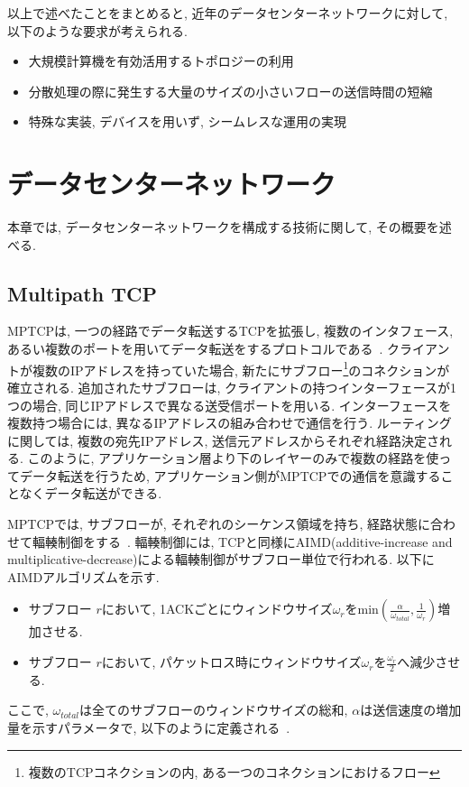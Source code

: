 \documentclass[10pt, a4paper, twocolumn]{jsarticle}
\begin{document}
以上で述べたことをまとめると, 近年のデータセンターネットワークに対して, 以下のような要求が考えられる.
\begin{itemize}
  \item 大規模計算機を有効活用するトポロジーの利用
  \item 分散処理の際に発生する大量のサイズの小さいフローの送信時間の短縮
  \item 特殊な実装, デバイスを用いず, シームレスな運用の実現
\end{itemize}

\section{データセンターネットワーク}
\label{sec:datacenter}
本章では, データセンターネットワークを構成する技術に関して, その概要を述べる.
\subsection{Multipath TCP}
MPTCPは, 一つの経路でデータ転送するTCPを拡張し, 複数のインタフェース,
あるい複数のポートを用いてデータ転送をするプロトコルである~\cite{mptcp}.
クライアントが複数のIPアドレスを持っていた場合, 新たにサブフロー\footnote{複数のTCPコネクションの内,
ある一つのコネクションにおけるフロー}のコネクションが確立される.
追加されたサブフローは, クライアントの持つインターフェースが1つの場合, 同じIPアドレスで異なる送受信ポートを用いる.
インターフェースを複数持つ場合には, 異なるIPアドレスの組み合わせで通信を行う.
ルーティングに関しては, 複数の宛先IPアドレス, 送信元アドレスからそれぞれ経路決定される.
このように, アプリケーション層より下のレイヤーのみで複数の経路を使ってデータ転送を行うため,
アプリケーション側がMPTCPでの通信を意識することなくデータ転送ができる.

MPTCPでは, サブフローが, それぞれのシーケンス領域を持ち, 経路状態に合わせて輻輳制御をする~\cite{cong}.
輻輳制御には, TCPと同様にAIMD(additive-increase and
multiplicative-decrease)による輻輳制御がサブフロー単位で行われる.
以下にAIMDアルゴリズムを示す.

\begin{itemize}
\item サブフロー $r$において,
1ACKごとにウィンドウサイズ$\omega_{r}$をmin$(\frac{\alpha}{\omega_{total}},
\frac{1}{\omega_r})$増加させる.
\item サブフロー $r$において, パケットロス時にウィンドウサイズ$\omega_r$を$\frac{\omega_r}{2}$へ減少させる.
\end{itemize}
ここで, $\omega_{total}$は全てのサブフローのウィンドウサイズの総和, $\alpha$は送信速度の増加量を示すパラメータで,
以下のように定義される~\cite{cong}.
\end{document}

